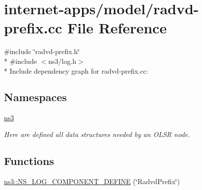 \hypertarget{radvd-prefix_8cc}{}\section{internet-\/apps/model/radvd-\/prefix.cc File Reference}
\label{radvd-prefix_8cc}
{\ttfamily \#include \char`\"{}radvd-\/prefix.\+h\char`\"{}}\\*
{\ttfamily \#include $<$ns3/log.\+h$>$}\\*
Include dependency graph for radvd-\/prefix.cc\+:
\subsection*{Namespaces}
\begin{DoxyCompactItemize}
\item 
 \hyperlink{namespacens3}{ns3}
\begin{DoxyCompactList}\small\item\em Here are defined all data structures needed by an O\+L\+SR node. \end{DoxyCompactList}\end{DoxyCompactItemize}
\subsection*{Functions}
\begin{DoxyCompactItemize}
\item 
\hyperlink{namespacens3_aa9446ce70a2b2ecc95a9785e71d1b866}{ns3\+::\+N\+S\+\_\+\+L\+O\+G\+\_\+\+C\+O\+M\+P\+O\+N\+E\+N\+T\+\_\+\+D\+E\+F\+I\+NE} (\char`\"{}Radvd\+Prefix\char`\"{})
\end{DoxyCompactItemize}

